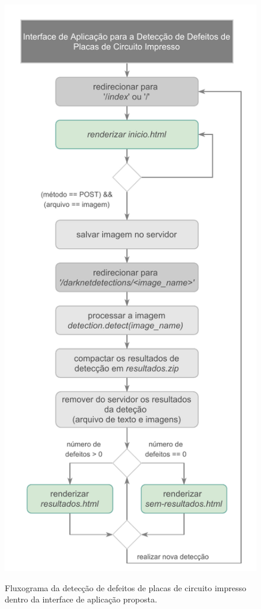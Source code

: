 \begin{figure}[H] %
  \centering
  \caption{Fluxograma da detecção de defeitos de placas de circuito impresso dentro da interface de aplicação proposta.}
  \includegraphics[scale=1.03]{img/img-resultados-api-fluxograma.pdf}
  \label{fig:resultados-api-etapas}
\end{figure}

